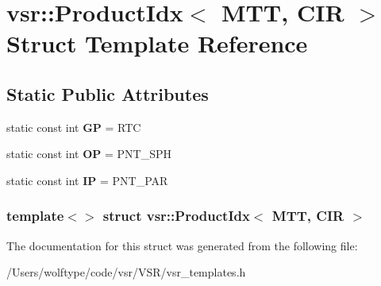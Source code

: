 \hypertarget{structvsr_1_1_product_idx_3_01_m_t_t_00_01_c_i_r_01_4}{\section{vsr\-:\-:Product\-Idx$<$ M\-T\-T, C\-I\-R $>$ Struct Template Reference}
\label{structvsr_1_1_product_idx_3_01_m_t_t_00_01_c_i_r_01_4}
}
\subsection*{Static Public Attributes}
\begin{DoxyCompactItemize}
\item 
\hypertarget{structvsr_1_1_product_idx_3_01_m_t_t_00_01_c_i_r_01_4_acdfa5d52ee4f698007f27c7457d0d610}{static const int {\bfseries G\-P} = R\-T\-C}\label{structvsr_1_1_product_idx_3_01_m_t_t_00_01_c_i_r_01_4_acdfa5d52ee4f698007f27c7457d0d610}

\item 
\hypertarget{structvsr_1_1_product_idx_3_01_m_t_t_00_01_c_i_r_01_4_a687b47969aaa4457a340f58e0dd8a035}{static const int {\bfseries O\-P} = P\-N\-T\-\_\-\-S\-P\-H}\label{structvsr_1_1_product_idx_3_01_m_t_t_00_01_c_i_r_01_4_a687b47969aaa4457a340f58e0dd8a035}

\item 
\hypertarget{structvsr_1_1_product_idx_3_01_m_t_t_00_01_c_i_r_01_4_a4311d5485592c26370028402129865f1}{static const int {\bfseries I\-P} = P\-N\-T\-\_\-\-P\-A\-R}\label{structvsr_1_1_product_idx_3_01_m_t_t_00_01_c_i_r_01_4_a4311d5485592c26370028402129865f1}

\end{DoxyCompactItemize}
\subsubsection*{template$<$$>$ struct vsr\-::\-Product\-Idx$<$ M\-T\-T, C\-I\-R $>$}



The documentation for this struct was generated from the following file\-:\begin{DoxyCompactItemize}
\item 
/\-Users/wolftype/code/vsr/\-V\-S\-R/vsr\-\_\-templates.\-h\end{DoxyCompactItemize}
